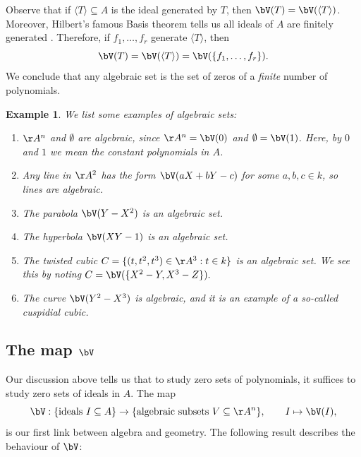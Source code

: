 \documentclass[12pt]{amsart}
\theoremstyle{plain}
\newtheorem{example}[theorem]{Example}
\begin{document}
Observe that if $\langle T \rangle \subseteq A$ is the ideal generated by $T$, then $\bV(T) = \bV(\langle T \rangle)$.
Moreover, Hilbert's famous Basis theorem tells us all ideals of $A$ are finitely generated \cite[\S 3.6]{Reid95}.
Therefore, if $f_1, \ldots, f_r$ generate $\langle T \rangle$, then 
$$\bV(T) = \bV(\langle T \rangle) = \bV(\{f_1, \ldots, f_r\}).$$
We conclude that any algebraic set is the set of zeros of a \emph{finite} number of polynomials.

\begin{example}\label{algsetex}
We list some examples of algebraic sets:
\begin{enumerate}
\item
$\AA^n$ and $\emptyset$ are algebraic, since $\AA^n = \bV(0)$ and $\emptyset = \bV(1)$.
Here, by $0$ and $1$ we mean the constant polynomials in $A$.

\item
Any line in $\AA^2$ has the form $\bV(aX+bY-c)$ for some $a, b, c \in k$, so lines are algebraic.

\item
The parabola $\bV(Y-X^2)$ is an algebraic set.

\item
The hyperbola $\bV(XY - 1)$ is an algebraic set.

\item
The twisted cubic $C = \{(t, t^2, t^3) \in \AA^3 : t \in k\}$ is an algebraic set.
We see this by noting $C = \bV(\{X^2 - Y, X^3 - Z\}).$

\item 
The curve $\bV(Y^2 - X^3)$ is algebraic, and it is an example of a so-called cuspidial cubic.
\end{enumerate}
\end{example}





\subsection{The map $\bV$}
Our discussion above tells us that to study zero sets of polynomials, it suffices to study zero sets of ideals in $A$.
The map
$$\bV : \{\text{ideals } I \subseteq A\} \to \{\text{algebraic subsets } V \subseteq \AA^n\}, \qquad I \mapsto \bV(I),$$
is our first link between algebra and geometry.
The following result describes the behaviour of $\bV$:
\end{document}
